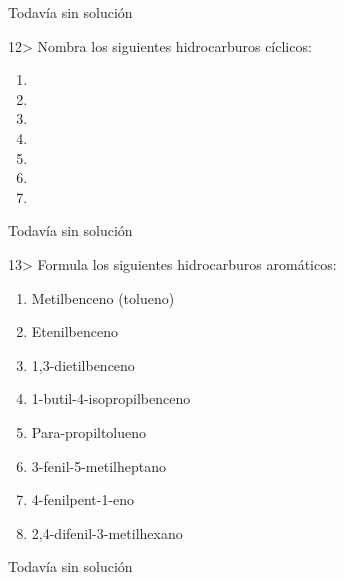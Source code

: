 \documentclass[twocolumn]{article}
\begin{document}
\begin{solution}[print=false]
  Todavía sin solución
\end{solution}

\begin{exercise}
  12> Nombra los siguientes hidrocarburos cíclicos:
  \begin{enumerate}
    \item {}
    \item {}
    \item {}
    \item {}
    \item {}
    \item {}
    \item {}
  \end{enumerate}
\end{exercise}

\begin{solution}[print=false]
  Todavía sin solución
\end{solution}

\begin{exercise}
  13> Formula los siguientes hidrocarburos aromáticos:
  \begin{enumerate}
    \item Metilbenceno (tolueno)
    \item Etenilbenceno
    \item 1,3-dietilbenceno
    \item 1-butil-4-isopropilbenceno
    \item Para-propiltolueno
    \item 3-fenil-5-metilheptano
    \item 4-fenilpent-1-eno
    \item 2,4-difenil-3-metilhexano
  \end{enumerate}
\end{exercise}

\begin{solution}[print=false]
  Todavía sin solución
\end{solution}
\end{document}
